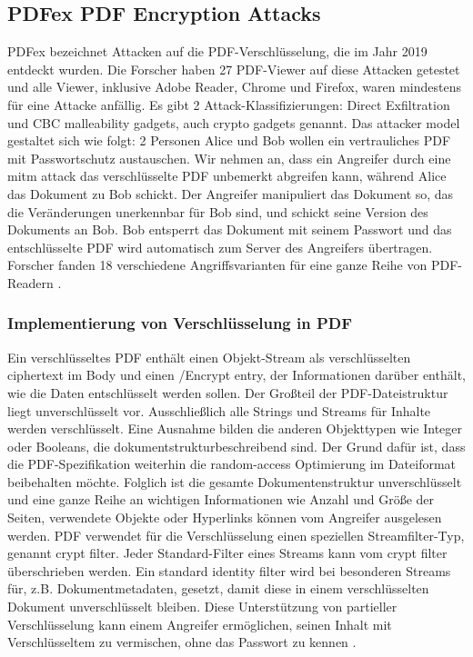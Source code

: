 \subsection{PDFex PDF Encryption Attacks}
PDFex bezeichnet Attacken auf die PDF-Verschlüsselung, die im Jahr 2019 entdeckt wurden. Die Forscher haben 27 PDF-Viewer auf diese Attacken getestet und alle Viewer, inklusive Adobe Reader, Chrome und Firefox, waren mindestens für eine Attacke anfällig. Es gibt 2 Attack-Klassifizierungen: Direct Exfiltration und CBC malleability gadgets, auch crypto gadgets genannt. Das attacker model gestaltet sich wie folgt: 2 Personen Alice und Bob wollen ein vertrauliches PDF mit Passwortschutz austauschen. Wir nehmen an, dass ein Angreifer durch eine \gls{mitm} attack das verschlüsselte PDF unbemerkt abgreifen kann, während Alice das Dokument zu Bob schickt. Der Angreifer manipuliert das Dokument so, das die Veränderungen unerkennbar für Bob sind, und schickt seine Version des Dokuments an Bob. Bob entsperrt das Dokument mit seinem Passwort und das entschlüsselte PDF wird automatisch zum Server des Angreifers übertragen. Forscher fanden 18 verschiedene Angriffsvarianten für eine ganze Reihe von PDF-Readern \cite{ccc-break-pdf, pdfex}.

\subsubsection{Implementierung von Verschlüsselung in PDF}
Ein verschlüsseltes PDF enthält einen Objekt-Stream als verschlüsselten ciphertext im Body und einen /Encrypt entry, der Informationen darüber enthält, wie die Daten entschlüsselt werden sollen. Der Großteil der PDF-Dateistruktur liegt unverschlüsselt vor. Ausschließlich alle Strings und Streams für Inhalte werden verschlüsselt. Eine Ausnahme bilden die anderen Objekttypen wie Integer oder Booleans, die dokumentstrukturbeschreibend sind. Der Grund dafür ist, dass die PDF-Spezifikation weiterhin die random-access Optimierung im Dateiformat beibehalten möchte. Folglich ist die gesamte Dokumentenstruktur unverschlüsselt und eine ganze Reihe an wichtigen Informationen wie Anzahl und Größe der Seiten, verwendete Objekte oder Hyperlinks können vom Angreifer ausgelesen werden. PDF verwendet für die Verschlüsselung einen speziellen Streamfilter-Typ, genannt crypt filter. Jeder Standard-Filter eines Streams kann vom crypt filter überschrieben werden. Ein standard identity filter wird bei besonderen Streams für, z.B. Dokumentmetadaten, gesetzt, damit diese in einem verschlüsselten Dokument unverschlüsselt bleiben. Diese Unterstützung von partieller Verschlüsselung kann einem Angreifer ermöglichen, seinen Inhalt mit Verschlüsseltem zu vermischen, ohne das Passwort zu kennen \cite{ccc-break-pdf}.

